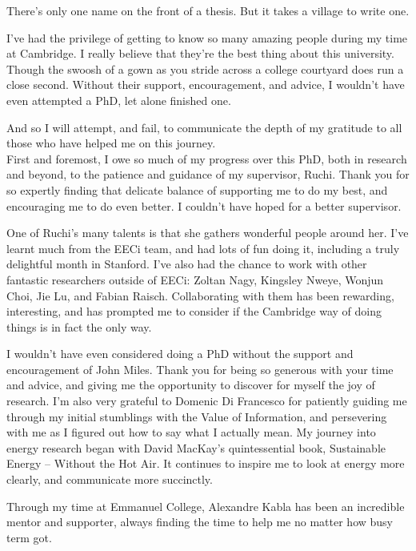 
\begin{acknowledgements}

    There's only one name on the front of a thesis. But it takes a village to write one.

    I've had the privilege of getting to know so many amazing people during my time at Cambridge. I really believe that they're the best thing about this university. Though the swoosh of a gown as you stride across a college courtyard does run a close second.
    Without their support, encouragement, and advice, I wouldn't have even attempted a PhD, let alone finished one.

    And so I will attempt, and fail, to communicate the depth of my gratitude to all those who have helped me on this journey.\\

    First and foremost, I owe so much of my progress over this PhD, both in research and beyond, to the patience and guidance of my supervisor, Ruchi.
    Thank you for so expertly finding that delicate balance of supporting me to do my best, and encouraging me to do even better. I couldn't have hoped for a better supervisor.

    One of Ruchi's many talents is that she gathers wonderful people around her. I've learnt much from the EECi team, and had lots of fun doing it, including a truly delightful month in Stanford. I've also had the chance to work with other fantastic researchers outside of EECi: Zoltan Nagy, Kingsley Nweye, Wonjun Choi, Jie Lu, and Fabian Raisch. Collaborating with them has been rewarding, interesting, and has prompted me to consider if the Cambridge way of doing things is in fact the only way.

    I wouldn't have even considered doing a PhD without the support and encouragement of John Miles. Thank you for being so generous with your time and advice, and giving me the opportunity to discover for myself the joy of research.
    I'm also very grateful to Domenic Di Francesco for patiently guiding me through my initial stumblings with the Value of Information, and persevering with me as I figured out how to say what I actually mean.
    My journey into energy research began with David MacKay's quintessential book, Sustainable Energy -- Without the Hot Air. It continues to inspire me to look at energy more clearly, and communicate more succinctly.

    \cleardoublepage
    \thispagestyle{empty}
    Through my time at Emmanuel College, Alexandre Kabla has been an incredible mentor and supporter, always finding the time to help me no matter how busy term got.


\end{acknowledgements}
